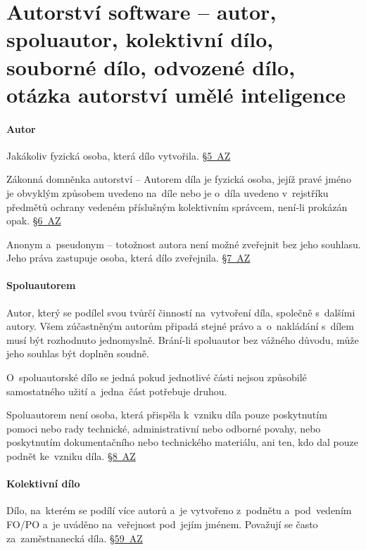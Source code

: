 \clearpage
\section{Autorství software -- autor, spoluautor, kolektivní dílo, souborné dílo, odvozené dílo, otázka autorství umělé inteligence}

\paragraph{Autor} Jakákoliv fyzická osoba, která dílo vytvořila. \href{https://www.zakonyprolidi.cz/cs/2000-121#p5}{§5~AZ}

Zákonná domněnka autorství -- Autorem díla je fyzická osoba, jejíž pravé jméno je obvyklým způsobem uvedeno na~díle nebo je o~díla uvedeno v~rejstříku předmětů ochrany vedeném příslušným kolektivním správcem, není-li prokázán opak. \href{https://www.zakonyprolidi.cz/cs/2000-121#p6}{§6~AZ}

Anonym a~pseudonym -- totožnost autora není možné zveřejnit bez jeho souhlasu. Jeho práva zastupuje osoba, která dílo zveřejnila. \href{https://www.zakonyprolidi.cz/cs/2000-121#p7}{§7~AZ}

\paragraph{Spoluautorem} Autor, který se podílel svou tvůrčí činností na~vytvoření díla, společně s~dalšími autory. Všem zúčastněným autorům připadá stejné právo a~o~nakládání s~dílem musí být rozhodnuto jednomyslně. Brání-li spoluautor bez vážného důvodu, může jeho souhlas být doplněn soudně.

O~spoluautorské dílo se jedná pokud jednotlivé části nejsou způsobilé samostatného užití a~jedna~část potřebuje druhou.

Spoluautorem není osoba, která přispěla k~vzniku díla pouze poskytnutím pomoci nebo rady technické, administrativní nebo odborné povahy, nebo poskytnutím dokumentačního nebo technického materiálu, ani ten, kdo dal pouze podnět ke~vzniku díla. \href{https://www.zakonyprolidi.cz/cs/2000-121#p8}{§8~AZ}

\paragraph{Kolektivní dílo} Dílo, na~kterém se podílí více autorů a~je vytvořeno z~podnětu a~pod~vedením FO/PO a~je uváděno na~veřejnost pod~jejím jménem. Považují se často za~zaměstnanecká díla. \href{https://www.zakonyprolidi.cz/cs/2000-121#p59}{§59~AZ}

